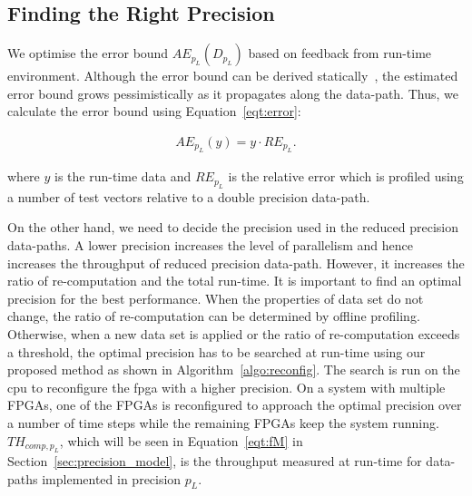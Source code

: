\subsection{Finding the Right Precision}
\label{sec:precision_search}
We optimise the error bound $AE_{p_L}(D_{p_L})$ based on feedback from run-time environment.
Although the error bound can be derived statically~\cite{lee05},
the estimated error bound grows pessimistically as it propagates along the data-path.
Thus, we calculate the error bound using Equation~\ref{eqt:error}:

\begin{equation}
\begin{aligned}
AE_{p_L}(y) = y \cdot RE_{p_L} \mbox{.}
\end{aligned}
\label{eqt:error}
\end{equation}

where $y$ is the run-time data and $RE_{p_L}$ is the relative error which is profiled using a number of test vectors relative to a double precision data-path.

On the other hand, we need to decide the precision used in the reduced precision data-paths.
A lower precision increases the level of parallelism and hence increases the throughput of reduced precision data-path.
However, it increases the ratio of re-computation and the total run-time.
It is important to find an optimal precision for the best performance.
When the properties of data set do not change, the ratio of re-computation can be determined by offline profiling.
Otherwise, when a new data set is applied or the ratio of re-computation exceeds a threshold, the optimal precision has to be searched at run-time using our proposed method as shown in Algorithm~\ref{algo:reconfig}.
The search is run on the \gls{cpu} to reconfigure the \gls{fpga} with a higher precision.
On a system with multiple FPGAs, one of the FPGAs is reconfigured to approach the optimal precision over a number of time steps
while the remaining FPGAs keep the system running.
$TH_{comp,p_L}$, which will be seen in Equation~\ref{eqt:fM} in Section~\ref{sec:precision_model}, is the throughput measured at run-time for data-paths implemented in precision $p_L$.

